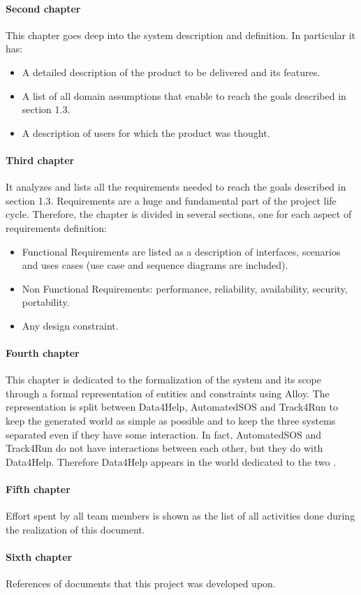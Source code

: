 \documentclass[../rasd.tex]{subfiles}
\begin{document}
		\paragraph{Second chapter}
		This chapter goes deep into the system description and definition. In particular it has:
		\begin{itemize}
			\item A detailed description of the product to be delivered and its features.
			\item A list of all domain assumptions that enable to reach the goals described in section 1.3.
			\item A description of users for which the product was thought.
		\end{itemize}
		\paragraph{Third chapter}
		It analyzes and lists all the requirements needed to reach the goals described in section 1.3. Requirements are a huge and fundamental part of the project life cycle. Therefore, the chapter is divided in several sections, one for each aspect of requirements definition:
		\begin{itemize}
			\item Functional Requirements are listed as a description of interfaces, scenarios and uses cases (use case and sequence diagrams are included).
			\item Non Functional Requirements: performance, reliability, availability, security, portability.
			\item Any design constraint.
		\end{itemize}
		\paragraph{Fourth chapter}
		This chapter is dedicated to the formalization of the system and its scope through a formal representation of entities and constraints using Alloy. The representation is split between Data4Help, AutomatedSOS and Track4Run to keep the generated world as simple as possible and to keep the three systems separated even if they have some interaction. In fact, AutomatedSOS and Track4Run do not have interactions between each other, but they do with Data4Help. Therefore Data4Help appears in the world dedicated to the two .
		\paragraph{Fifth chapter}
		Effort spent by all team members is shown as the list of all activities done during the realization of this document.
		\paragraph{Sixth chapter}
		References of documents that this project was developed upon.
		
\end{document}
